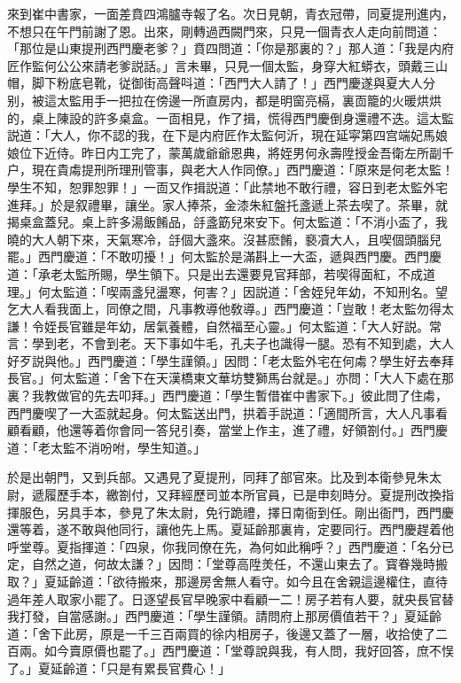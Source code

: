 來到崔中書家，一面差賁四鴻臚寺報了名。次日見朝，青衣冠帶，同夏提刑進内，不想只在午門前謝了恩。出來，剛轉過西闕門來，只見一個青衣人走向前問道：「那位是山東提刑西門慶老爹？」賁四問道：「你是那裏的？」那人道：「我是内府匠作監何公公來請老爹説話。」言未畢，只見一個太監，身穿大紅蟒衣，頭戴三山帽，脚下粉底皂靴，従御街高聲呌道：「西門大人請了！」西門慶遂與夏大人分别，被這太監用手一把拉在傍邊一所直房内，都是明窗亮槅，裏靣籠的火暖烘烘的，桌上陳設的許多桌盒。一靣相見，作了揖，慌得西門慶倒身還禮不迭。這太監説道：「大人，你不認的我，在下是内府匠作太監何沂，現在延寜第四宫端妃馬娘娘位下近侍。昨日内工完了，蒙萬歲爺爺恩典，將姪男何永壽陞授金吾衛左所副千户，現在貴䖏提刑所理刑管事，與老大人作同僚。」西門慶道：「原來是何老太監！學生不知，恕罪恕罪！」一靣又作揖説道：「此禁地不敢行禮，容日到老太監外宅進拜。」於是叙禮畢，讓坐。家人捧茶，金漆朱紅盤托盞遞上茶去喫了。茶畢，就揭桌盒蓋兒。桌上許多湯飯餚品，㧱盞筯兒來安下。何太監道：「不消小盃了，我曉的大人朝下來，天氣寒冷，㧱個大盞來。沒甚麽餚，褻凟大人，且喫個頭腦兒罷。」西門慶道：「不敢叨擾！」何太監於是滿斟上一大盃，遞與西門慶。西門慶道：「承老太監所賜，學生領下。只是出去還要見官拜部，若喫得面紅，不成道理。」何太監道：「喫兩盞兒盪寒，何害？」因説道：「舍姪兒年幼，不知刑名。望乞大人看我面上，同僚之間，凡事教導他敎導。」西門慶道：「豈敢！老太監勿得太謙！令姪長官雖是年幼，居氣養體，自然福至心靈。」何太監道：「大人好説。常言：學到老，不會到老。天下事如牛毛，孔夫子也識得一腿。恐有不知到處，大人好歹説與他。」西門慶道：「學生謹領。」因問：「老太監外宅在何䖏？學生好去奉拜長官。」何太監道：「舍下在天漢橋東文華坊雙獅馬台就是。」亦問：「大人下處在那裏？我教做官的先去叩拜。」西門慶道：「學生暫借崔中書家下。」彼此問了住䖏，西門慶喫了一大盃就起身。何太監送出門，拱着手説道：「適間所言，大人凡事看顧看顧，他還等着你會同一答兒引奏，當堂上作主，進了禮，好領劄付。」西門慶道：「老太監不消吩咐，學生知道。」

於是出朝門，又到兵部。又遇見了夏提刑，同拜了部官來。比及到本衛參見朱太尉，遞履歷手本，繳劄付，又拜經歷司並本所官員，已是申刻時分。夏提刑改換指揮服色，另具手本，參見了朱太尉，免行跪禮，擇日南衙到任。剛出衙門，西門慶還等着，遂不敢與他同行，讓他先上馬。夏延齡那裏肯，定要同行。西門慶趕着他呼堂尊。夏指揮道：「四泉，你我同僚在先，為何如此稱呼？」西門慶道：「名分已定，自然之道，何故太謙？」因問：「堂尊高陞羙任，不還山東去了。寳眷幾時搬取？」夏延齡道：「欲待搬來，那邊房舍無人看守。如今且在舍親這邊權住，直待過年差人取家小罷了。日逐望長官早晚家中看顧一二！房子若有人要，就央長官替我打發，自當感謝。」西門慶道：「學生謹領。請問府上那房價值若干？」夏延齡道：「舍下此房，原是一千三百兩買的徐内相房子，後邊又蓋了一層，收拾使了二百兩。如今賣原價也罷了。」西門慶道：「堂尊說與我，有人問，我好回答，庶不悮了。」夏延齡道：「只是有累長官費心！」

